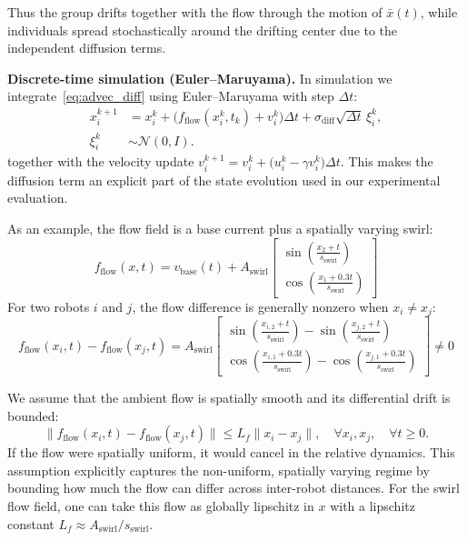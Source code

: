 \documentclass[conference]{IEEEconf}
\theoremstyle{plain}
\begin{document}
Thus the group drifts together with the flow through the motion of $\bar{x}(t)$, while individuals spread stochastically around the drifting center due to the independent diffusion terms.

\noindent\textbf{Discrete-time simulation (Euler--Maruyama).}
In simulation we integrate~\eqref{eq:advec_diff} using Euler--Maruyama with step $\Delta t$:
\begin{equation}
\begin{aligned}
x_i^{k+1} &= x_i^k + \big(f_{\mathrm{flow}}(x_i^k,t_k)+v_i^k\big)\Delta t
           + \sigma_{\mathrm{diff}}\sqrt{\Delta t}\,\xi_i^k,\\
\xi_i^k &\sim \mathcal{N}(0,I).
\end{aligned}
\label{eq:em}
\end{equation}
together with the velocity update $v_i^{k+1}=v_i^k+\big(u_i^k-\gamma v_i^k\big)\Delta t$.
This makes the diffusion term an explicit part of the state evolution used in our experimental evaluation.

As an example, the flow field is a base current plus a spatially varying swirl:
\begin{equation*}
f_{\text{flow}}(x,t) = v_{\text{base}}(t) + A_{\text{swirl}}
\begin{bmatrix}
    \sin \! \left( \tfrac{x_2 + t}{s_{\text{swirl}}} \right) \\
    \cos \! \left( \tfrac{x_1 + 0.3t}{s_{\text{swirl}}} \right)
\end{bmatrix}
\end{equation*}
For two robots $i$ and $j$, the flow difference is generally nonzero when $x_{i} \neq x_{j}$:
\begin{equation*}
f_{\text{flow}}(x_i, t) - f_{\text{flow}}(x_j, t) = A_{\text{swirl}}
\left[ \begin{smallmatrix}
    \sin \! \left( \frac{x_{i,2} + t}{s_{\text{swirl}}} \right) - \sin \! \left( \frac{x_{j,2} + t}{s_{\text{swirl}}} \right) \\
    \cos \! \left( \frac{x_{i,1} + 0.3t}{s_{\text{swirl}}} \right) - \cos \! \left( \frac{x_{j,1} + 0.3t}{s_{\text{swirl}}} \right)
\end{smallmatrix} \right] \neq 0
\end{equation*}

We assume that the ambient flow is spatially smooth and its differential drift is bounded:
$$
\|f_{\text{flow}}(x_i, t) - f_{\text{flow}}(x_j, t)\| \le L_f \|x_i - x_j\|, \quad \forall x_i, x_j, \quad \forall t \ge 0.
$$
If the flow were spatially uniform, it would cancel in the relative dynamics. This assumption explicitly captures the non-uniform, spatially varying regime by bounding how much the flow can differ across inter-robot distances. For the swirl flow field, one can take this flow as globally lipschitz in $x$ with a lipschitz constant $L_f \approx A_{\text{swirl}} / s_{\text{swirl}}$.
\end{document}
